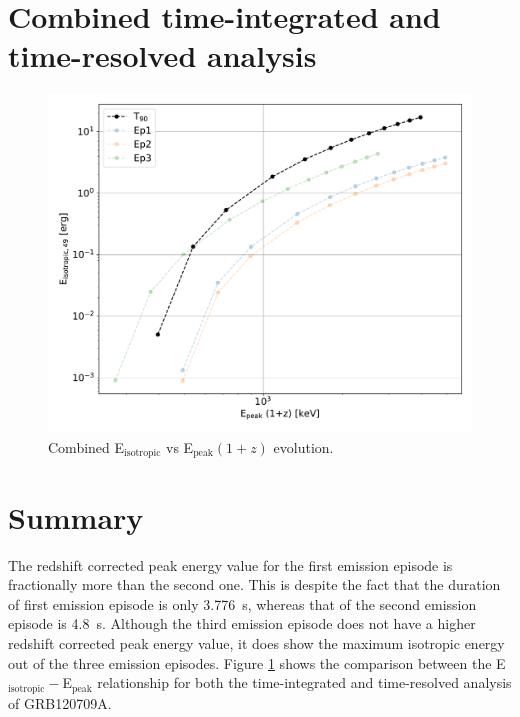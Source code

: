 \documentclass[10pt,report]{article}
\begin{document}
\newpage
	\section{Combined time-integrated and time-resolved analysis}
	\begin{figure}[!h]
		\centering
		\includegraphics[width=\textwidth]{eisoep_compare}
		\caption{Combined E$_\text{isotropic}$ vs E$_\text{peak}(1+z)$ evolution.}
		\label{fig:eisoepcompare}
	\end{figure}
	


	\section{Summary}
	The redshift corrected peak energy value for the first emission episode is fractionally more than the second one. This is despite the fact that the duration of first emission episode is only \SI{3.776}{\second}, whereas that of the second emission episode is \SI{4.8}{\second}. Although the third emission episode does not have a higher redshift corrected peak energy value, it does show the maximum isotropic energy out of the three emission episodes. Figure \ref{fig:eisoepcompare} shows the comparison between the E$_\text{isotropic}-$E$_\text{peak}$ relationship for both the time-integrated and time-resolved analysis of GRB120709A.
		
\end{document}
